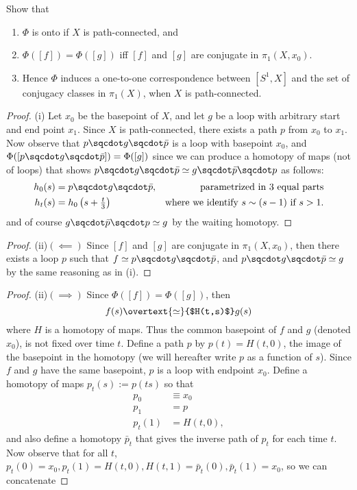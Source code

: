 \documentclass[12pt,letterpaper]{article}
\begin{document}
\begin{enumerate}
Show that 
\begin{enumerate}
\item $\Phi$ is onto if $X$ is path-connected, and 
\item $\Phi([f])=\Phi([g])$ iff $[f]$ and $[g]$ are conjugate in $\pi_1(X,x_0)$.
\item Hence $\Phi$ induces a one-to-one correspondence between $[S^1,X]$ and the set of conjugacy classes in $\pi_1(X)$, when $X$ is path-connected. 
\end{enumerate}
\begin{proof}(i)
Let $x_0$ be the basepoint of $X$, and let $g$ be a loop with arbitrary start and end point $x_1$. Since $X$ is path-connected, there exists a path $p$ from $x_0$ to $x_1$. Now observe that $p\sqcdot g \sqcdot \bar{p}$ is a loop with basepoint $x_0$, and $\Phi([p\sqcdot g \sqcdot \bar{p}])=\Phi([g])$ since we can produce a homotopy of maps (not of loops) that shows $p\sqcdot g\sqcdot \bar{p} \simeq g\sqcdot \bar{p} \sqcdot p$ as follows: 
\begin{align*}
h_0(s)&= p\sqcdot g\sqcdot \bar{p}, &\text{parametrized in 3 equal parts} \\
h_t(s)&=h_0\left(s+\tfrac{t}{3}\right) &\text{where we identify $s\sim (s-1)$ if $s>1$.}
\end{align*}
and of course $g\sqcdot \bar{p} \sqcdot p \simeq g$ by the waiting homotopy. 
\end{proof}
\begin{proof}(ii)$(\impliedby)$ Since $[f]$ and $[g]$ are conjugate in $\pi_1(X,x_0)$, then there exists a loop $p$ such that $f\simeq p\sqcdot g\sqcdot \bar{p}$, and $p\sqcdot g\sqcdot \bar{p} \simeq g$ by the same reasoning as in (i). 
\end{proof}
\begin{proof}(ii)$(\implies)$
Since $\Phi([f])=\Phi([g])$, then 
$$f(s)\overtext{\simeq}{$H(t,s)$}g(s)$$ 
where $H$ is a homotopy of maps. Thus the common basepoint of $f$ and $g$ (denoted $x_0$), is not fixed over time $t$. Define a path $p$ by $p(t)=H(t,0)$, the image of the basepoint in the homotopy (we will hereafter write $p$ as a function of $s$). Since $f$ and $g$ have the same basepoint, $p$ is a loop with endpoint $x_0$. Define a homotopy of maps $p_t(s):=p(ts)$ so that 
\begin{align*}
p_0&\equiv x_0 \\
p_1&=p \\
p_t(1)&=H(t,0),
\end{align*}
and also define a homotopy $\bar{p}_t$ that gives the inverse path of $p_t$ for each time $t$. Now observe that for all $t$, $p_t(0)=x_0, p_t(1)=H(t,0), H(t,1)=\bar{p}_t(0), \bar{p}_t(1)=x_0$, so we can concatenate 

\end{proof}
\end{enumerate}
\end{document}
